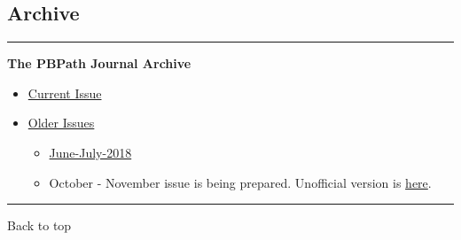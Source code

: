 \documentclass[]{article}
\begin{document}
\pagebreak

\hypertarget{archive}{%
\subsection{Archive}\label{archive}}

\begin{center}\rule{0.5\linewidth}{\linethickness}\end{center}

\textbf{The PBPath Journal Archive}

\begin{itemize}
\item
  \href{http://pbpath.org/journal-watch/}{Current Issue}
\item
  \href{http://pbpath.org/journal-watch-archive/}{Older Issues}

  \begin{itemize}
  \item
    \href{http://pbpath.org/pbpath-journal-watch-june-july-2018/}{June-July-2018}
  \item
    October - November issue is being prepared. Unofficial version is
    \href{http://pbpath.org/journal-watch-upcoming-issue/}{here}.
  \end{itemize}
\end{itemize}

\begin{center}\rule{0.5\linewidth}{\linethickness}\end{center}

Back to top
\end{document}
